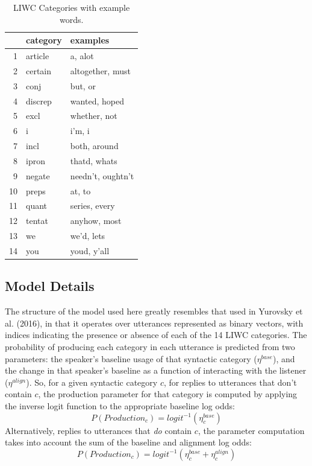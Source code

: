 \documentclass[10pt, letterpaper]{article}
\begin{document}
\begin{table}[H]
\centering
\begin{tabular}{rll}
  \hline
 & category & examples \\ 
  \hline
1 & article & a, alot \\ 
  2 & certain & altogether, must \\ 
  3 & conj & but, or \\ 
  4 & discrep & wanted, hoped \\ 
  5 & excl & whether, not \\ 
  6 & i & i'm, i \\ 
  7 & incl & both, around \\ 
  8 & ipron & thatd, whats \\ 
  9 & negate & needn't, oughtn't \\ 
  10 & preps & at, to \\ 
  11 & quant & series, every \\ 
  12 & tentat & anyhow, most \\ 
  13 & we & we'd, lets \\ 
  14 & you & youd, y'all \\ 
   \hline
\end{tabular}
\caption{LIWC Categories with example words.} 
\end{table}

\hypertarget{model-details}{%
\subsection{Model Details}\label{model-details}}

The structure of the model used here greatly resembles that used in
Yurovsky et al. (2016), in that it operates over utterances represented
as binary vectors, with indices indicating the presence or absence of
each of the 14 LIWC categories. The probability of producing each
category in each utterance is predicted from two parameters: the
speaker's baseline usage of that syntactic category (\(\eta^{base}\)),
and the change in that speaker's baseline as a function of interacting
with the listener (\(\eta^{align}\)). So, for a given syntactic category
\(c\), for replies to utterances that don't contain \(c\), the
production parameter for that category is computed by applying the
inverse logit function to the appropriate baseline log odds: \[
P(Production_c) = logit^{-1}(\eta^{base}_c)
\] Alternatively, replies to utterances that \emph{do} contain \(c\),
the parameter computation takes into account the sum of the baseline and
alignment log odds: \[
P(Production_c) = logit^{-1}(\eta^{base}_c+\eta^{align}_c)
\]
\end{document}
